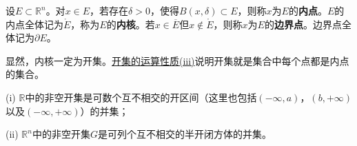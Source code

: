 \documentclass[lang=cn,newtx,10pt,scheme=chinese]{../Template/elegantbook}
\begin{document}
\begin{definition}[内点与边界点]\label{definition:内点与边界点}
  设\(E\subset\mathbb{R}^n\)。对\(x\in E\)，若存在\(\delta>0\)，使得\(B(x,\delta)\subset E\)，则称\(x\)为\(E\)的\textbf{内点}。\(E\)的内点全体记为\(\mathring{E}\)，称为\(E\)的\textbf{内核}。若\(x\in\overline{E}\)但\(x\notin\mathring{E}\)，则称\(x\)为\(E\)的\textbf{边界点}。边界点全体记为\(\partial E\)。
\end{definition}
\begin{note}
  显然，内核一定为开集。\hyperref[theorem:开集的运算性质]{开集的运算性质(iii)}说明开集就是集合中每个点都是内点的集合。
\end{note}

\begin{theorem}\label{theorem:Rn中的非空开集的性质}
(i) \(\mathbb{R}\)中的非空开集是可数个互不相交的开区间（这里也包括\((-\infty,a)\)，\((b,+\infty)\)以及\((-\infty,+\infty)\)）的并集；

(ii) \(\mathbb{R}^n\)中的非空开集\(G\)是可列个互不相交的半开闭方体的并集。
\end{theorem}
\end{document}
